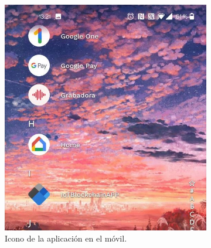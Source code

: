 \begin{figure}[h!]
  \begin{subfigure}{0.5\textwidth}
    \includegraphics[width=\linewidth]{imagenes/desarrollo/web/pwa/icon_app}
    \caption{Icono de la aplicación en el móvil.}
    \label{fig:icon-app}
  \end{subfigure}
  \begin{subfigure}{0.5\textwidth}

\end{subfigure}
\end{figure}
